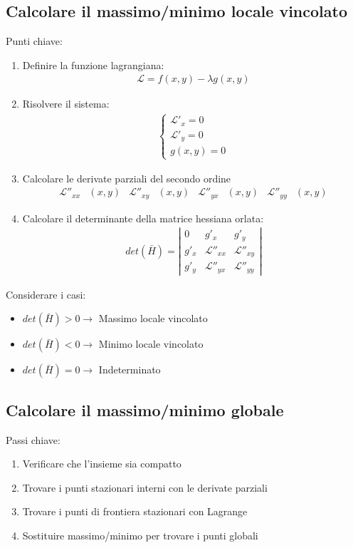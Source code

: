 \documentclass[a4paper]{article}
\begin{document}
	\subsection{Calcolare il massimo/minimo locale vincolato}		
	Punti chiave:
	\begin{enumerate}
		\item Definire la funzione lagrangiana:
			\begin{align*}
				\mathcal{L} = f(x,y) - \lambda g(x,y)
			\end{align*}
		\item Risolvere il sistema:
		\begin{align*}
			\begin{cases}
				\mathcal{L}'_x = 0\\
				\mathcal{L}'_y = 0\\
				g(x,y) = 0
			\end{cases}
		\end{align*}
		\item Calcolare le derivate parziali del secondo ordine
			\begin{align*}
			\mathcal{L}''_{xx}&(x,y)	&	\mathcal{L}''_{xy}&(x,y)	&	\mathcal{L}''_{yx}&(x,y)	&	\mathcal{L}''_{yy}&(x,y)
			\end{align*}
		\item Calcolare il determinante della matrice hessiana orlata:
		\begin{align*}
			det(\bar{H}) = \left|
			\begin{array}{ccc}
			0 & g'_x & g'_y \\ 
			g'_x & \mathcal{L}''_{xx} & \mathcal{L}''_{xy} \\ 
			g'_y & \mathcal{L}''_{yx} & \mathcal{L}''_{yy}
			\end{array} \right|
		\end{align*}
		\end{enumerate}		
		Considerare i casi:
		\begin{itemize}
			\item $det(\bar{H}) > 0 \to$ Massimo locale vincolato
			\item $det (\bar{H}) < 0 \to$ Minimo locale vincolato
			\item $det (\bar{H}) = 0 \to$ Indeterminato
		\end{itemize}

		\subsection{Calcolare il massimo/minimo globale}			
		Passi chiave:\\
		\begin{enumerate}
			\item Verificare che l'insieme sia compatto
			\item Trovare i punti stazionari interni con le derivate parziali
			\item Trovare i punti di frontiera stazionari con Lagrange
			\item Sostituire massimo/minimo per trovare i punti globali
		\end{enumerate}
			
\end{document}

